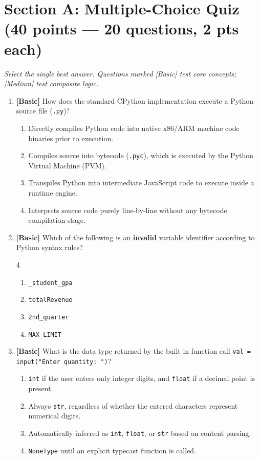 \documentclass[11pt,a4paper]{article}
\begin{document}
\vspace{2.5mm}
\section*{Section A: Multiple-Choice Quiz \hfill \normalsize\normalfont(40 points --- 20 questions, 2 pts each)}
\textit{Select the single best answer. Questions marked [Basic] test core concepts; [Medium] test composite logic.}

\begin{enumerate}[label=\textbf{Q\arabic*.},leftmargin=1.8em,itemsep=0.6pt,topsep=0.2pt]

\item \textbf{[Basic]} How does the standard CPython implementation execute a Python source file (\texttt{.py})?
\begin{enumerate}[label=\Alph*.,leftmargin=1.8em]
  \item Directly compiles Python code into native x86/ARM machine code binaries prior to execution.
  \item Compiles source into bytecode (\texttt{.pyc}), which is executed by the Python Virtual Machine (PVM).
  \item Transpiles Python into intermediate JavaScript code to execute inside a runtime engine.
  \item Interprets source code purely line-by-line without any bytecode compilation stage.
\end{enumerate}

\item \textbf{[Basic]} Which of the following is an \textbf{invalid} variable identifier according to Python syntax rules?
\begin{multicols}{4}
\begin{enumerate}[label=\Alph*.]
  \item \texttt{\_student\_gpa}
  \item \texttt{totalRevenue}
  \item \texttt{2nd\_quarter}
  \item \texttt{MAX\_LIMIT}
\end{enumerate}
\end{multicols}

\item \textbf{[Basic]} What is the data type returned by the built-in function call \texttt{val = input("Enter quantity: ")}?
\begin{enumerate}[label=\Alph*.,leftmargin=1.8em]
  \item \texttt{int} if the user enters only integer digits, and \texttt{float} if a decimal point is present.
  \item Always \texttt{str}, regardless of whether the entered characters represent numerical digits.
  \item Automatically inferred as \texttt{int}, \texttt{float}, or \texttt{str} based on content parsing.
  \item \texttt{NoneType} until an explicit typecast function is called.
\end{enumerate}


\end{enumerate}
\end{document}
